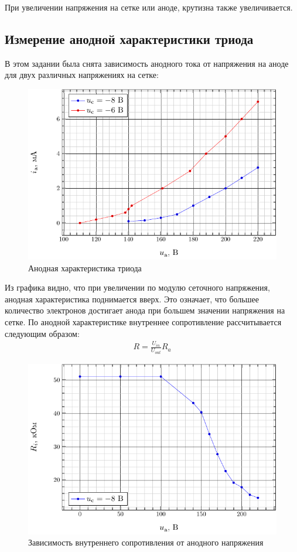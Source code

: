 \documentclass[a5paper,11pt]{extarticle}
\begin{document}
При увеличении напряжения на сетке или аноде, крутизна также увеличивается.
\subsection{Измерение анодной характеристики триода}
В этом задании была снята зависимость анодного тока от напряжения на аноде для двух различных напряжениях на сетке:
\begin{figure}[H]
	\centering
	\includegraphics[]{fig/ia_from_ua.pdf}
	\vspace{-1em}
	\caption{Анодная характеристика триода}
	\label{fig:1}
\end{figure}

Из графика видно, что при увеличении по модулю сеточного напряжения, анодная характеристика поднимается вверх. Это означает, что большее количество электронов достигает анода при большем значении напряжения на сетке.
По анодной характеристике внутреннее сопротивление рассчитывается следующим образом:
\begin{gather}
	R = \frac{U_{in}}{U_{out}} R_a
\end{gather}
\begin{figure}[H]
	\centering
	\includegraphics[]{fig/r_from_ua.pdf}
	\vspace{-1em}
	\caption{Зависимость внутреннего сопротивления от анодного напряжения}
	\label{fig:1}
\end{figure}
\end{document}
